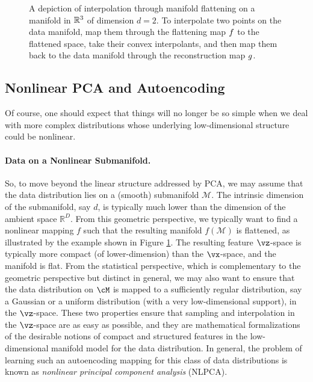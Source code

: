 \documentclass[../../book-main.tex]{subfiles}
\begin{document}
\begin{figure}
  \caption{A depiction of interpolation through manifold flattening
    on a manifold in \(\mathbb{R}^{3}\) of dimension \(d = 2\). To interpolate
    two points on the data manifold, map them through the flattening
    map \(f\) to the flattened space, take their convex interpolants,
    and then map them back to the data manifold through the
  reconstruction map \(g\).}
  \label{fig:idealized_interpolation}
\end{figure}

\subsection{Nonlinear PCA and Autoencoding}\label{sub:nonlinear-pca}\label{sec:NLPCA}
Of course, one should expect that things will no longer be so simple
when we deal with more complex distributions whose underlying
low-dimensional structure could be nonlinear.

\paragraph{Data on a Nonlinear Submanifold.} So, to move beyond the
linear structure addressed by PCA, we may assume that the data distribution lies on a (smooth) submanifold $\mathcal{M}$. The intrinsic dimension of the submanifold, say $d$, is typically much lower than the
dimension of the ambient space $\mathbb{R}^D$. From this geometric
perspective, we typically want to find a nonlinear mapping $f$ such that
the resulting manifold
$f(\mathcal{M})$ is flattened, as illustrated by the example shown in Figure
\ref{fig:idealized_interpolation}. The resulting feature $\vz$-space
is typically
more compact (of lower-dimension) than the $\vx$-space, and the
manifold is flat.
From the statistical perspective, which is complementary to the geometric
perspective but distinct in general, we may also want to ensure that the data
distribution on $\cM$ is mapped to a sufficiently regular
distribution, say a Gaussian or a uniform distribution (with a 
very low-dimensional support), in the $\vz$-space. These two properties ensure that sampling and interpolation in the $\vz$-space are as easy as possible, and they are mathematical formalizations of the desirable
notions of compact and structured features in the low-dimensional manifold
model for the data distribution.
In general, the problem of learning such an autoencoding mapping for this class
of data distributions is known as {\em nonlinear principal component analysis}
(NLPCA).
\end{document}
